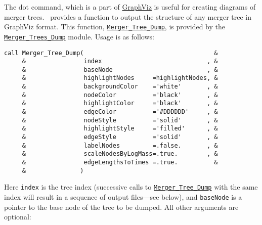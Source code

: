 The {\sc dot} command, which is a part of \href{http://www.graphviz.org/}{{\sc GraphViz}} is useful for creating diagrams of merger trees. \glc\ provides a function to output the structure of any merger tree in {\sc GraphViz} format. This function, \hyperlink{objects.merger_trees.dump.F90:merger_trees_dump:merger_tree_dump}{{\tt Merger\_Tree\_Dump}}, is provided by the \hyperlink{objects.merger_trees.dump.F90:merger_trees_dump:merger_tree_dump}{{\tt Merger\_Trees\_Dump}} module. Usage is as follows:
\begin{lstlisting}[escapechar=@,breaklines,prebreak=\&,postbreak=\&]
call Merger_Tree_Dump(                                    &
     &                index                             , &
     &                baseNode                          , &
     &                highlightNodes     =highlightNodes, &
     &                backgroundColor    ='white'       , &
     &                nodeColor          ='black'       , &
     &                highlightColor     ='black'       , &
     &                edgeColor          ='#DDDDDD'     , &
     &                nodeStyle          ='solid'       , &
     &                highlightStyle     ='filled'      , &
     &                edgeStyle          ='solid'       , &
     &                labelNodes         =.false.       , &
     &                scaleNodesByLogMass=.true.        , &
     &                edgeLengthsToTimes =.true.          &
     &               )
\end{lstlisting}
Here {\tt index} is the tree index (successive calls to \hyperlink{objects.merger_trees.dump.F90:merger_trees_dump:merger_tree_dump}{{\tt Merger\_Tree\_Dump}} with the same index will result in a sequence of output files---see below), and {\tt baseNode} is a pointer to the base node of the tree to be dumped. All other arguments are optional:
